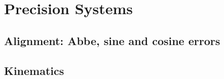 \chapter{Precision Systems}
	
	
\section{Alignment: Abbe, sine and cosine errors}
	
	
\section{Kinematics}
	
	
	
	
	
	
	
	
	
	
	
	
	
	
	
	
	
	
	
	
	
	
	
	
	
	
	
	
	
	
	
	
	
	
	
	
	
	
	
	
	
	
	
	
	